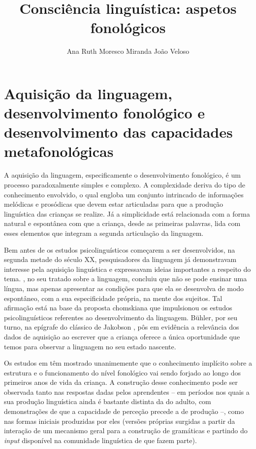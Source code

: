 \documentclass[output=paper]{LSP/langsci}
\author{Ana Ruth Moresco Miranda\affiliation{Universidade Federal de Pelotas}\lastand 
João Veloso\affiliation{Faculdade de Letras da Universidade do Porto\\Centro de Linguística da Universidade do Porto (FCT-UID/LIN/0022/2016)}
}
\title{Consciência linguística: aspetos fonológicos}
\begin{document}
\section{Aquisição da linguagem, desenvolvimento fonológico e desenvolvimento das capacidades metafonológicas}
\label{sec:miranda_aquisicao}

A aquisição da linguagem, especificamente o desenvolvimento fonológico, é um processo paradoxalmente simples e complexo. A complexidade deriva do tipo de conhecimento envolvido, o qual engloba um conjunto intrincado de informações melódicas e prosódicas que devem estar articuladas para que a produção linguística das crianças se realize. Já a simplicidade está relacionada com a forma natural e espontânea com que a criança, desde as primeiras palavras, lida com esses elementos que integram a segunda articulação da linguagem.

Bem antes de os estudos psicolinguísticos começarem a ser desenvolvidos, na segunda metade do século XX, pesquisadores da linguagem já demonstravam interesse pela aquisição linguística e expressavam ideias importantes a respeito do tema. \citet{humboldt}, no seu tratado sobre a linguagem, concluiu que não se pode ensinar uma língua, mas apenas apresentar as condições para que ela se desenvolva de modo espontâneo, com a sua especificidade própria, na mente dos sujeitos. Tal afirmação está na base da proposta chomskiana que impulsionou os estudos psicolinguísticos referentes ao desenvolvimento da linguagem. Bühler, por seu turno, na epígrafe do clássico de Jakobson  \citeyearpar{jakobson1941}, pôs em evidência a relevância dos dados de aquisição ao escrever que a criança oferece a única oportunidade que temos para observar a linguagem no seu estado nascente.

Os estudos em  têm mostrado unanimemente que o conhecimento implícito sobre a estrutura e o funcionamento do nível fonológico vai sendo forjado ao longo dos primeiros anos de vida da criança. A construção desse conhecimento pode ser observada tanto nas respostas dadas pelos aprendentes -- em períodos nos quais a sua produção linguística ainda é bastante distinta da do adulto, com demonstrações de que a capacidade de perceção precede a de produção --, como nas formas iniciais produzidas por eles (versões próprias surgidas a partir da interação de um mecanismo geral para a construção de gramáticas e partindo do \textit{input} disponível na comunidade linguística de que fazem parte).
\end{document}
